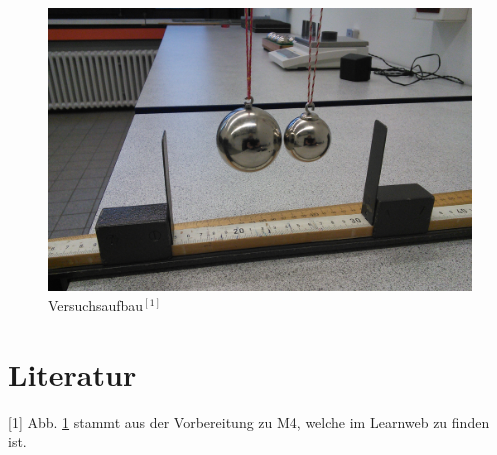 \documentclass[11pt,a4paper,titlepage, ngerman]{article}
\begin{document}
	
	\begin{figure}[ht]
		\centering
		\includegraphics[width=\textwidth]{M4_1.jpg}
		\caption{Versuchsaufbau$^{[1]}$}
		\label{abb:VersuchsaufbauStoss}	
	\end{figure}
	
	\section*{Literatur}
	
	
	[1] Abb. \ref*{abb:VersuchsaufbauStoss} stammt aus der Vorbereitung zu M4, welche im Learnweb zu finden ist.
	
\end{document}
